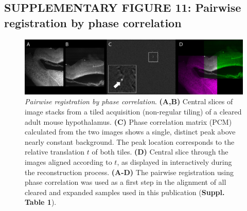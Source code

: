 \documentclass[]{spie}  %
\begin{document}
\begin{figure}[h!]
{}
\label{fig:sup-fig-globalopt}
\end{figure}

\pagebreak

\subsection*{SUPPLEMENTARY FIGURE 11: Pairwise registration by phase correlation}
\vspace{-2mm}
\begin{figure}[h!]
\includegraphics[width=\textwidth]{fig-stitching.jpg}
\vspace{-2.0mm}
\caption{\hspace{-0.5mm} \emph{Pairwise registration by phase correlation}. \textbf{(A,B)} Central slices of image stacks from a tiled acquisition (non-regular tiling) of a cleared adult mouse hypothalamus. \textbf{(C)} Phase correlation matrix (PCM) calculated from the two images shows a single, distinct peak above nearly constant background. The peak location corresponds to the relative translation $t$ of both tiles. \textbf{(D)} Central slice through the images aligned according to $t$, as displayed in interactively during the reconstruction process. \textbf{(A-D)} The pairwise registration using phase correlation was used as a first step in the alignment of all cleared and expanded samples used in this publication (\textbf{Suppl. Table 1}).
}
\label{fig:sup-fig-stitching}
\end{figure}

\pagebreak
\end{document}
